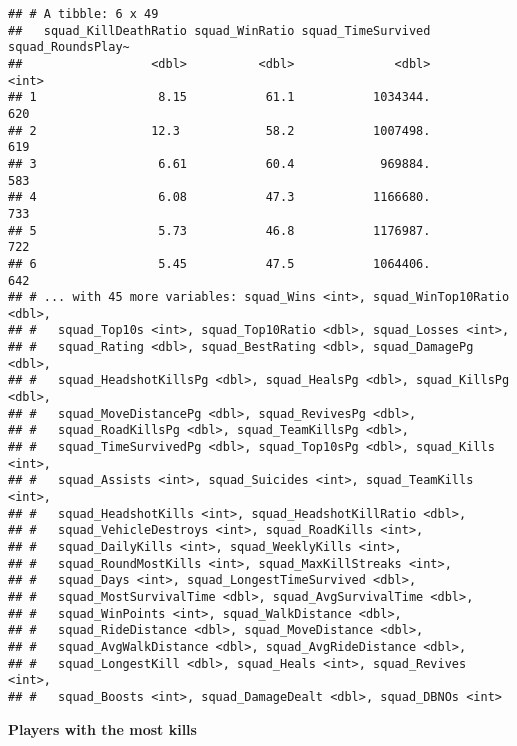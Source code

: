 \documentclass[]{article}
\begin{document}
\begin{verbatim}
## # A tibble: 6 x 49
##   squad_KillDeathRatio squad_WinRatio squad_TimeSurvived squad_RoundsPlay~
##                  <dbl>          <dbl>              <dbl>             <int>
## 1                 8.15           61.1           1034344.               620
## 2                12.3            58.2           1007498.               619
## 3                 6.61           60.4            969884.               583
## 4                 6.08           47.3           1166680.               733
## 5                 5.73           46.8           1176987.               722
## 6                 5.45           47.5           1064406.               642
## # ... with 45 more variables: squad_Wins <int>, squad_WinTop10Ratio <dbl>,
## #   squad_Top10s <int>, squad_Top10Ratio <dbl>, squad_Losses <int>,
## #   squad_Rating <dbl>, squad_BestRating <dbl>, squad_DamagePg <dbl>,
## #   squad_HeadshotKillsPg <dbl>, squad_HealsPg <dbl>, squad_KillsPg <dbl>,
## #   squad_MoveDistancePg <dbl>, squad_RevivesPg <dbl>,
## #   squad_RoadKillsPg <dbl>, squad_TeamKillsPg <dbl>,
## #   squad_TimeSurvivedPg <dbl>, squad_Top10sPg <dbl>, squad_Kills <int>,
## #   squad_Assists <int>, squad_Suicides <int>, squad_TeamKills <int>,
## #   squad_HeadshotKills <int>, squad_HeadshotKillRatio <dbl>,
## #   squad_VehicleDestroys <int>, squad_RoadKills <int>,
## #   squad_DailyKills <int>, squad_WeeklyKills <int>,
## #   squad_RoundMostKills <int>, squad_MaxKillStreaks <int>,
## #   squad_Days <int>, squad_LongestTimeSurvived <dbl>,
## #   squad_MostSurvivalTime <dbl>, squad_AvgSurvivalTime <dbl>,
## #   squad_WinPoints <int>, squad_WalkDistance <dbl>,
## #   squad_RideDistance <dbl>, squad_MoveDistance <dbl>,
## #   squad_AvgWalkDistance <dbl>, squad_AvgRideDistance <dbl>,
## #   squad_LongestKill <dbl>, squad_Heals <int>, squad_Revives <int>,
## #   squad_Boosts <int>, squad_DamageDealt <dbl>, squad_DBNOs <int>
\end{verbatim}

\textbf{Players with the most kills}
\end{document}
